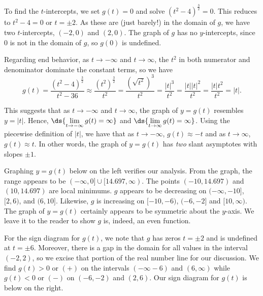 \documentclass{ximera}
\begin{document}
\begin{example}
\begin{enumerate}
To find the $t$-intercepts, we set $g(t) = 0$ and solve $(t^2-4)^{\frac{3}{2}} = 0$. This reduces to $t^2-4 =0$ or $t = \pm 2$.  As these are (just barely!) in the domain of $g$, we have two $t$-intercepts, $(-2,0)$ and $(2,0)$.  The graph of $g$ has no $y$-intercepts, since $0$ is not in the domain of $g$, so $g(0)$ is undefined.

Regarding end behavior, as $t \rightarrow  -\infty$ and $t \rightarrow  \infty$, the $t^2$ in both numerator and denominator dominate the constant terms, so we have \[ g(t) =  \dfrac{ (t^2-4)^{\frac{3}{2}} }{t^2-36} \approx  \dfrac{\left(t^2\right)^{\frac{3}{2}}}{t^2} = \dfrac{\left(\sqrt{t^2} \right)^3}{t^2} = \dfrac{|t|^3}{t^2} = \dfrac{|t| |t|^2}{t^2} = \dfrac{|t| t^2}{t^2} = |t|. \]


This suggests that as $t \rightarrow -\infty$ and $t \rightarrow  \infty$, the graph of $y = g(t)$ resembles $y = |t|$.  Hence, $\ds{\lim_{t \rightarrow   -\infty} g(t) = \infty}$ and $\ds{\lim_{t \rightarrow   \infty} g(t) = \infty}$.  Using the piecewise definition of $|t|$, we have that as $t \rightarrow -\infty$, $g(t) \approx -t$ and as $t \rightarrow \infty$, $g(t) \approx t$.  In other words, the graph of  $y = g(t)$ has \textit{two} slant asymptotes with slopes $\pm 1$. 

Graphing $y=g(t)$ below on the left verifies our analysis.  From the graph, the range appears to be $(-\infty, 0] \cup [14.697, \infty)$.  The points $(-10, 14.697)$ and $(10, 14.697)$ are local minimums.  $g$ appears to be decreasing on  $(-\infty, -10]$, $[2, 6)$, and $(6, 10]$. Likewise, $g$ is increasing on $[-10, -6)$, $(-6, -2]$ and $[10, \infty)$.  The graph of $y=g(t)$ certainly appears to be symmetric about the $y$-axis.  We leave it to the reader to show $g$ is, indeed, an even function.

\enlargethispage{1in}

For the sign diagram for $g(t)$, we note that $g$ has zeros $t = \pm 2$ and is undefined at $t = \pm 6$.  Moreover, there is a gap in the domain for all values in the interval $(-2,2)$, so we excise that portion of the real number line for our discussion.  We find $g(t) > 0$ or $(+)$ on the intervals $(-\infty -6)$ and $(6, \infty)$ while $g(t) < 0$ or $(-)$ on $(-6,-2)$ and $(2, 6)$.  Our sign diagram for $g(t)$ is below on the right.  

\begin{image}
% 



\end{image}
\end{enumerate}
\end{example}
\end{document}

